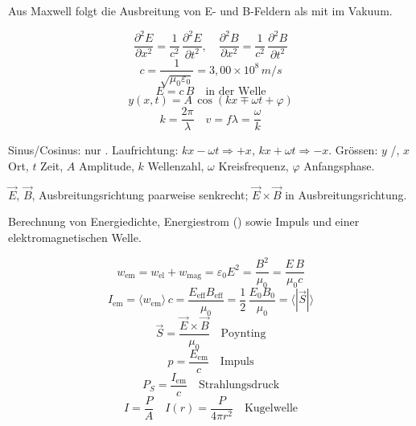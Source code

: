 \begin{runintext}
Aus Maxwell folgt die Ausbreitung von E- und B-Feldern als  mit  im Vakuum.
\end{runintext}
\begin{formulabox}
\[ \frac{\partial^2 E}{\partial x^2} = \frac{1}{c^2}\,\frac{\partial^2 E}{\partial t^2}, \quad \frac{\partial^2 B}{\partial x^2} = \frac{1}{c^2}\,\frac{\partial^2 B}{\partial t^2} \]
\formulasep
\[ c = \frac{1}{\sqrt{\mu_0\varepsilon_0}} = 3{,}00\times 10^8\,\si{m/s} \]
\[ E = c\,B \quad \text{in der Welle} \]
\formulasep
\[ y(x,t) = A\,\cos(k x \mp \omega t + \varphi) \]
\[ k = \frac{2\pi}{\lambda} \quad v = f\lambda = \frac{\omega}{k} \]
\end{formulabox}
\begin{runintext}
Sinus/Cosinus: nur . Laufrichtung: $kx-\omega t\Rightarrow +x$, $kx+\omega t\Rightarrow -x$. Grössen: $y$ /, $x$ Ort, $t$ Zeit, $A$ Amplitude, $k$ Wellenzahl, $\omega$ Kreisfrequenz, $\varphi$ Anfangsphase.
\end{runintext}
\begin{runintext}
$\vec{E}$, $\vec{B}$, Ausbreitungsrichtung paarweise senkrecht; $\vec{E}\times\vec{B}$ in Ausbreitungsrichtung.
\end{runintext}


\begin{runintext}
Berechnung von Energiedichte, Energiestrom () sowie Impuls und  einer elektromagnetischen Welle.
\end{runintext}
\begin{formulabox}
\[ w_{\mathrm{em}} = w_{\mathrm{el}} + w_{\mathrm{mag}} = \varepsilon_0 E^2 = \frac{B^2}{\mu_0} = \frac{E\,B}{\mu_0 c} \]
\formulasep
\[ I_{\mathrm{em}} = \langle w_{\mathrm{em}}\rangle\,c = \frac{E_{\mathrm{eff}}B_{\mathrm{eff}}}{\mu_0} = \frac{1}{2}\,\frac{E_0 B_0}{\mu_0} = \langle|\vec{S}|\rangle \]
\[ \vec{S} = \frac{\vec{E}\times\vec{B}}{\mu_0} \quad \text{Poynting} \]
\formulasep
\[ p = \frac{E_{\mathrm{em}}}{c} \quad \text{Impuls} \]
\[ P_S = \frac{I_{\mathrm{em}}}{c} \quad \text{Strahlungsdruck} \]
\formulasep
\[ I = \frac{P}{A} \quad I(r) = \frac{P}{4\pi r^2} \quad \text{Kugelwelle} \]
\end{formulabox}

